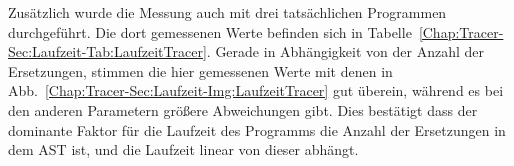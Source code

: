 Zusätzlich wurde die Messung auch mit drei tatsächlichen Programmen 
durchgeführt. Die dort gemessenen Werte befinden sich in 
Tabelle~\ref{Chap:Tracer-Sec:Laufzeit-Tab:LaufzeitTracer}. Gerade in 
Abhängigkeit von der Anzahl der Ersetzungen, stimmen die hier gemessenen Werte
mit denen in Abb.~\ref{Chap:Tracer-Sec:Laufzeit-Img:LaufzeitTracer} gut 
überein, während es bei den anderen Parametern größere Abweichungen gibt.
Dies bestätigt dass der dominante Faktor für die Laufzeit des Programms 
die Anzahl der Ersetzungen in dem AST ist, und die Laufzeit linear von dieser 
abhängt.







